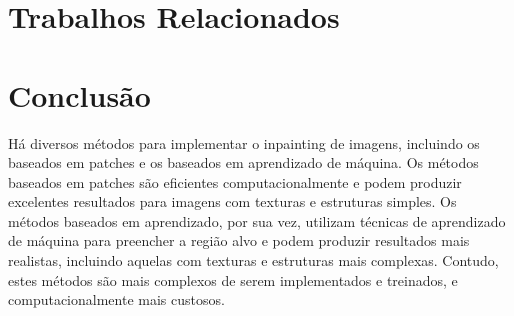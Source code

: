 \section{Trabalhos Relacionados} \label{related}


\section{Conclusão} \label{conclusion}
Há diversos métodos para implementar o inpainting de imagens, incluindo os baseados em patches e os baseados em aprendizado de máquina. Os métodos baseados em patches são eficientes computacionalmente e podem produzir excelentes resultados para imagens com texturas e estruturas simples. Os métodos baseados em aprendizado, por sua vez, utilizam técnicas de aprendizado de máquina para preencher a região alvo e podem produzir resultados mais realistas, incluindo aquelas com texturas e estruturas mais complexas. Contudo, estes métodos são mais complexos de serem implementados e treinados, e computacionalmente mais custosos.